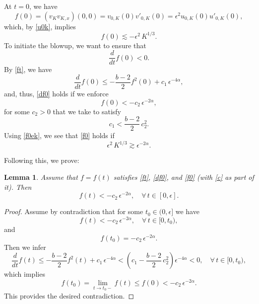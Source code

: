 \documentclass{amsart}
\newtheorem{lemma}[theorem]{Lemma}
\begin{document}
At $t=0$, we have
\[
f(0)=(v_K v_{K,x})(0, 0)=v_{0, K}(0)v'_{0, K}(0)=\epsilon^2 u_{0, K}(0)u'_{0, K}(0),
\]
which, by \eqref{u0k}, implies
\begin{equation}
f(0)\lesssim -\epsilon^2\, K^{1/3}.\label{f0ek}
\end{equation}
To initiate the blowup, we want to ensure that 
\begin{equation}
\frac{d}{dt}f(0)<0.\label{df0}
\end{equation}
By \eqref{ft}, we have
\[
\frac{d}{dt}f(0)\leq -\frac{b-2}{2}f^2(0) +c_1\,\epsilon^{-4\alpha},
\]
and, thus, \eqref{df0} holds if we enforce
\begin{equation}
f(0)< -c_2\,\epsilon^{-2\alpha}, \label{f0}
\end{equation}
for some $c_2>0$ that we take to satisfy 
\begin{equation}
c_1< \frac{b-2}{2}\,c_2^2.\label{c}
\end{equation}
Using \eqref{f0ek}, we see that \eqref{f0} holds if 
\begin{equation}
\boxed{\epsilon^2\, K^{1/3}\gtrsim \epsilon^{-2\alpha}.}\label{f0e}
\end{equation}

Following this, we prove:

\begin{lemma}
Assume that $f=f(t)$ satisfies \eqref{ft}, \eqref{df0}, and \eqref{f0} (with \eqref{c} as part of it). Then
\begin{equation}
f(t)< -c_2\,\epsilon^{-2\alpha}, \quad \forall\,t\in [0,\epsilon].\label{fce}
\end{equation}
\end{lemma}
\begin{proof}
Assume by contradiction that for some $t_0\in(0,\epsilon]$ we have
\[
f(t)< -c_2\,\epsilon^{-2\alpha}, \quad \forall\,t\in [0,t_0),
\] 
and 
\[
f(t_0)= -c_2\,\epsilon^{-2\alpha}.
\]
Then we infer
\[
\frac{d}{dt}f(t)\leq -\frac{b-2}{2}f^2(t) +c_1\,\epsilon^{-4\alpha}<(c_1-\frac{b-2}{2}\,c_2^2)\epsilon^{-4\alpha}<0, \quad \forall\,t\in [0,t_0),
\]
which implies
\[
f(t_0)=\lim_{t\to t_0-}f(t)\leq f(0)< -c_2\,\epsilon^{-2\alpha}.
\]
This provides the desired contradiction.
\end{proof}
\end{document}
